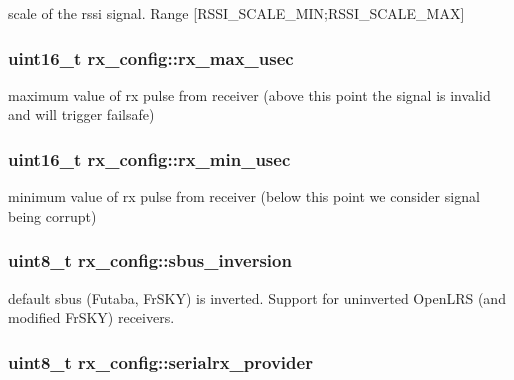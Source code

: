 scale of the rssi signal. Range \mbox{[}R\+S\+S\+I\+\_\+\+S\+C\+A\+L\+E\+\_\+\+M\+I\+N;R\+S\+S\+I\+\_\+\+S\+C\+A\+L\+E\+\_\+\+M\+A\+X\mbox{]} 

\hypertarget{structrx__config_a96854d89202e04fd984d0f561dbea7e4}{
\subsubsection[{rx\+\_\+max\+\_\+usec}]{\setlength{\rightskip}{0pt plus 5cm}uint16\+\_\+t rx\+\_\+config\+::rx\+\_\+max\+\_\+usec}}\label{structrx__config_a96854d89202e04fd984d0f561dbea7e4}


maximum value of rx pulse from receiver (above this point the signal is invalid and will trigger failsafe) 

\hypertarget{structrx__config_a086895901d9b2a9e2d5682cc82c05bac}{
\subsubsection[{rx\+\_\+min\+\_\+usec}]{\setlength{\rightskip}{0pt plus 5cm}uint16\+\_\+t rx\+\_\+config\+::rx\+\_\+min\+\_\+usec}}\label{structrx__config_a086895901d9b2a9e2d5682cc82c05bac}


minimum value of rx pulse from receiver (below this point we consider signal being corrupt) 

\hypertarget{structrx__config_af35bf9196e92a85c8fe7f37b98a03ae5}{
\subsubsection[{sbus\+\_\+inversion}]{\setlength{\rightskip}{0pt plus 5cm}uint8\+\_\+t rx\+\_\+config\+::sbus\+\_\+inversion}}\label{structrx__config_af35bf9196e92a85c8fe7f37b98a03ae5}


default sbus (Futaba, Fr\+S\+K\+Y) is inverted. Support for uninverted Open\+L\+R\+S (and modified Fr\+S\+K\+Y) receivers. 

\hypertarget{structrx__config_a7b07d2f4be0c5a71dc3c9245a7b8a619}{
\subsubsection[{serialrx\+\_\+provider}]{\setlength{\rightskip}{0pt plus 5cm}uint8\+\_\+t rx\+\_\+config\+::serialrx\+\_\+provider}}\label{structrx__config_a7b07d2f4be0c5a71dc3c9245a7b8a619}


